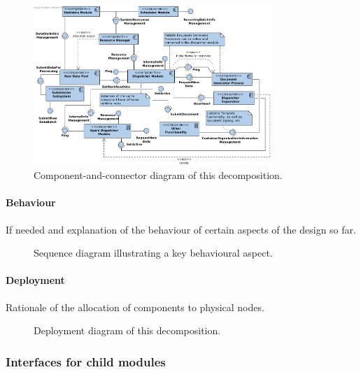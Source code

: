 \documentclass[a4paper,10pt]{article}
\begin{document}
\begin{figure}[!htp]
    \centering
    \includegraphics[width=0.8\textwidth]{comp_diag_1.png}
    \caption{Component-and-connector diagram of this decomposition.}\label{fig:it1-cc_main}
\end{figure}

\paragraph{Behaviour}
If needed and explanation of the behaviour of certain aspects of the design so
far.

\begin{figure}[!htp]
    \centering
    \caption{Sequence diagram illustrating a key behavioural aspect.
        }\label{fig:it1-seq_aspect1}
\end{figure}

\paragraph{Deployment}
Rationale of the allocation of components to physical nodes.

\begin{figure}[!htp]
    \centering
    \caption{Deployment diagram of this decomposition.
        }\label{fig:it1-depl_main}
\end{figure}

\subsubsection{Interfaces for child modules}
\end{document}
